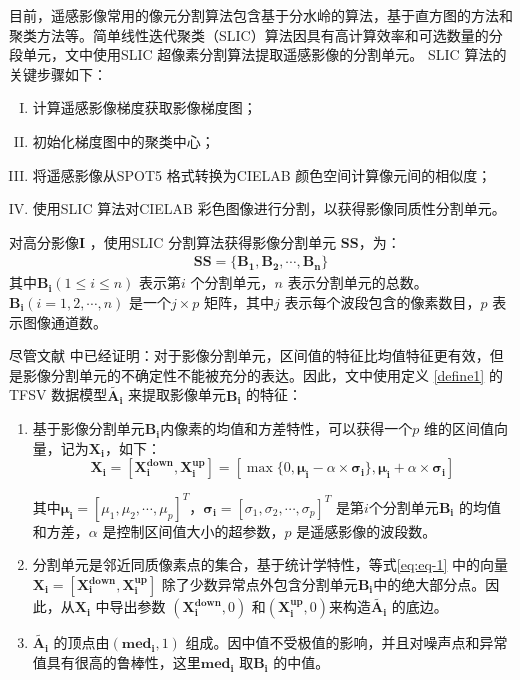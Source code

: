 目前，遥感影像常用的像元分割算法包含基于分水岭的算法，基于直方图的方法和聚类方法等\cite{roerdink2000watershed}。简单线性迭代聚类（SLIC）算法因具有高计算效率和可选数量的分段单元\cite{achanta2012slic}，文中使用SLIC 超像素分割算法提取遥感影像的分割单元。 SLIC 算法的关键步骤如下：
\begin{enumerate}[(I)]
    \item 计算遥感影像梯度获取影像梯度图；
    \item 初始化梯度图中的聚类中心；
    \item 将遥感影像从SPOT5 格式转换为CIELAB 颜色空间计算像元间的相似度；
    \item 使用SLIC 算法对CIELAB 彩色图像进行分割，以获得影像同质性分割单元。
\end{enumerate}

对高分影像$\bm{I}$ ，使用SLIC 分割算法获得影像分割单元 $\bm{SS}$，为：
\begin{equation}\label{eq:image_ss}
    \begin{split}
        \bm{SS} = \lbrace \bm{B_1}, \bm{B_2},\bm{\cdots}, \bm{B_n} \rbrace
    \end{split}
\end{equation}
其中$\bm{B_i}(1 \leq i \leq n)$ 表示第$i$ 个分割单元，$n$ 表示分割单元的总数。 $\bm{B_i}(i=1,2,\cdots, n)$ 是一个$j \times p$ 矩阵，其中$j$ 表示每个波段包含的像素数目，$p$ 表示图像通道数。


尽管文献\cite{he2016remote} 中已经证明：对于影像分割单元，区间值的特征比均值特征更有效，但是影像分割单元的不确定性不能被充分的表达。因此，文中使用定义 \ref{define1} 的TFSV 数据模型$\bm{\tilde{A_i}}$  来提取影像单元$\bm{B_i}$ 的特征：
\begin{enumerate}[ 1)]
    \item 基于影像分割单元$\bm{B_i}$内像素的均值和方差特性，可以获得一个$p$ 维的区间值向量，记为$\bm{X_i}$，如下：
          \begin{equation}\label{eq:eq-1}
              \bm{X_i} = [\bm{X_{i}^{down}},\bm{X_i^{up} }] = [\max{\lbrace 0,\bm{\mu_i} - \alpha \times \bm{\sigma_i} \rbrace}, \bm{\mu_i} + \alpha \times \bm{\sigma_i}]
          \end{equation}

          其中$\bm{\mu_i} = [\mu_{1}, \mu_2,\cdots,\mu_p]^T$，$\bm{\sigma_i} = [\sigma_{1},\sigma_2,\cdots,\sigma_p] ^T$ 是第$i$个分割单元$\bm{B_i}$ 的均值和方差，$\alpha$ 是控制区间值大小的超参数，$p$ 是遥感影像的波段数。
    \item 分割单元是邻近同质像素点的集合，基于统计学特性，等式\ref{eq:eq-1} 中的向量$\bm{X_i} = [\bm{X_{i}^{down}},\bm{X_i^{up} }]$ 除了少数异常点外包含分割单元$\bm{B_i}$中的绝大部分点。因此，从$\bm{X_i}$ 中导出参数 $(\bm{X_{i}^{down}},0)$ 和$(\bm{X_i^{up}},0)$来构造$\bm{\tilde{A_i}}$ 的底边。
    \item $\bm{\tilde{A_i}}$ 的顶点由$(\bm{med_i},1)$ 组成。因中值不受极值的影响，并且对噪声点和异常值具有很高的鲁棒性，这里$\bm{med_i}$ 取$\bm{B_i}$ 的中值。
\end{enumerate}


